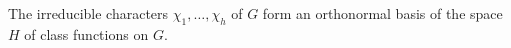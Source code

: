 The irreducible characters $\chi_1, \ldots, \chi_h$ of $G$ form an orthonormal basis of the space $H$ of class functions on $G$.
